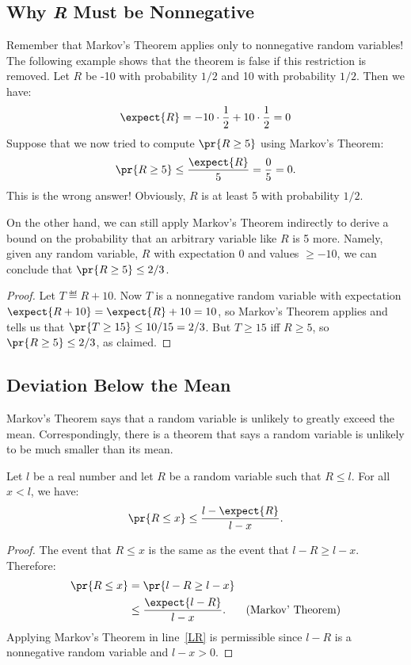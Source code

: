 \begin{editingnotes}

\subsection{Why \emph{R} Must be Nonnegative}

Remember that Markov's Theorem applies only to nonnegative random
variables!  The following example shows that the theorem is false if this
restriction is removed.  Let $R$ be -10 with probability $1/2$ and 10 with
probability $1/2$.  Then we have:
\[
\expect{R} = -10 \cdot \frac{1}{2} + 10 \cdot \frac{1}{2} = 0
\]
Suppose that we now tried to compute $\pr{R \geq 5}$ using Markov's
Theorem:
\begin{displaymath}
  \pr{R \geq 5} \leq \frac{\expect{R}}{5} = \frac{0}{5} = 0.
\end{displaymath}
This is the wrong answer!  Obviously, $R$ is at least 5 with
probability $1/2$.  

On the other hand, we can still apply Markov's Theorem indirectly to
derive a bound on the probability that an arbitrary variable like $R$ is 5
more.  Namely, given any random variable, $R$ with expectation 0 and
values $\geq -10$, we can conclude that $\pr{R \geq 5} \le 2/3$.
\begin{proof}
Let $T \eqdef R+10$.  Now $T$ is a nonnegative random variable with
expectation $\expect{R + 10} = \expect{R}+10= 10$, so Markov's Theorem
applies and tells us that $\pr{T \geq 15} \le 10/15 = 2/3$.  But $T \geq
15$ iff $R \geq 5$, so $\pr{R \geq 5} \leq 2/3$, as claimed.
\end{proof}

\subsection{Deviation Below the Mean}

Markov's Theorem says that a random variable is unlikely to greatly exceed
the mean.  Correspondingly, there is a theorem that says a random variable
is unlikely to be much smaller than its mean.

\begin{theorem}
\label{th:below}
Let $l$ be a real number and let $R$ be a random variable such that $R
\leq l$.  For all $x < l$, we have:
\[
\pr{R \leq x} \leq \frac{l - \expect{R}}{l - x}.
\]
\end{theorem}

\begin{proof}
The event that $R \leq x$ is the same as the event that $l - R \geq l -
x$.  Therefore:
\begin{align}
\pr{R \leq x} &  = \pr{l - R \geq l - x}\notag\\
 & \leq \frac{\expect{l - R}}{l - x}. & \text{(Markov' Theorem)}\label{LR}
\end{align}
Applying Markov's Theorem in line~\eqref{LR} is permissible
since $l - R$ is a nonnegative random variable and $l - x > 0$.
\end{proof}


\end{editingnotes}
